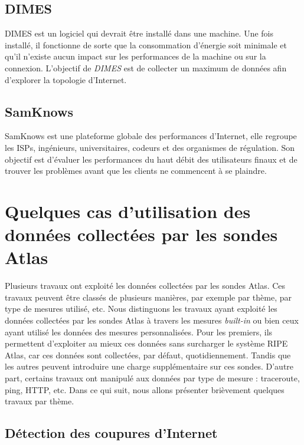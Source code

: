 \subsection{DIMES}
DIMES \cite{Shavitt:2005:DLI:1096536.1096546} est un logiciel qui devrait être installé dans une machine. Une fois installé, il fonctionne de sorte que la consommation d'énergie soit minimale et qu'il n'existe aucun impact sur les performances de la machine ou sur la connexion. L'objectif de \textit{DIMES} est de collecter un maximum de données afin d'explorer la topologie d'Internet.


\subsection{SamKnows}
SamKnows \cite{SamKnows}  est une plateforme globale des performances d'Internet, elle regroupe les ISPs, ingénieurs, universitaires, codeurs et des organismes de régulation. Son objectif est d'évaluer les performances du haut débit des utilisateurs finaux et de trouver les problèmes avant que les clients ne commencent à se plaindre. 

\section{Quelques cas d'utilisation des données collectées par les sondes Atlas} \label{use-cases-atlas}


Plusieurs travaux ont exploité les données collectées par les sondes Atlas. Ces travaux peuvent être classés de plusieurs manières, par exemple  par thème,  par  type de mesures utilisé, etc. Nous distinguons les travaux ayant exploité les données collectées par les sondes Atlas à travers les mesures \textit{built-in} ou bien ceux ayant utilisé les données des mesures personnalisées.  Pour les premiers, ils permettent d'exploiter au mieux ces données sans surcharger le système RIPE Atlas, car ces données sont collectées, par défaut, quotidiennement. Tandis que les autres peuvent introduire une charge supplémentaire sur ces sondes. D'autre part, certains travaux  ont manipulé  aux données par  type de mesure : traceroute, ping,  HTTP, etc. Dans ce qui suit, nous allons présenter brièvement quelques travaux par thème.

\subsection{Détection des coupures d'Internet}

